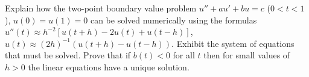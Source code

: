 Explain how the two-point boundary value problem $u''+au'+bu=c$
($0<t<1$), $u(0)=u(1)=0$ can be solved numerically using the formulas
$u''(t)\approx h^{-2}[u(t+h)-2u(t)+u(t-h)]$, $u(t)\approx
(2h)^{-1}(u(t+h)-u(t-h))$. Exhibit the system of equations that must
be solved. Prove that if $b(t)<0$ for all $t$ then for small values of
$h>0$ the linear equations have a unique solution.
